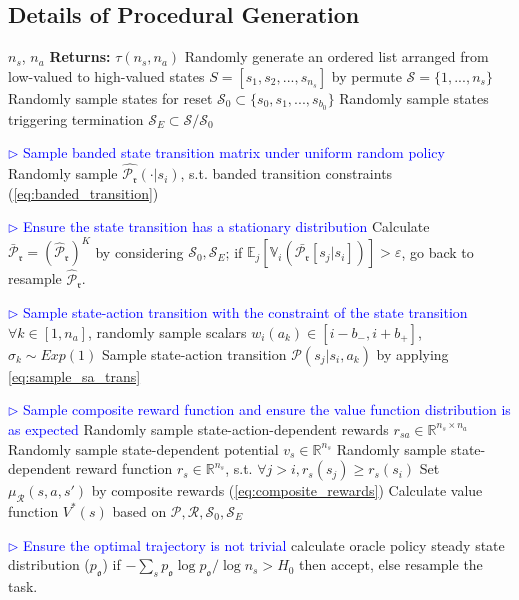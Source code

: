 \documentclass{article}
\newcommand{\TCP}[1]{\textcolor{blue}{$\triangleright$ #1}}
\begin{document}
\subsection{Details of Procedural Generation} \label{sec:anymdp_task_empirical}

\begin{algorithm}[htbp]
   \caption{AnyMDP $TaskSampler$}
   \label{alg:task_sampler}
   \begin{algorithmic}[1]
    $n_s$, $n_a$ {\bfseries Returns:} $\tau(n_s, n_a)$
   \STATE Randomly generate an ordered list arranged from low-valued to high-valued states $S=[s_1,s_2,...,s_{n_s}]$ by permute $\mathcal{S}=\{1,...,n_s\}$
   \STATE Randomly sample states for reset $\mathcal{S}_0 \subset \{s_0, s_1, ...,s_{b_0}\}$
   \STATE Randomly sample states triggering termination $\mathcal{S}_E \subset \mathcal{S} / \mathcal{S}_0$
   
   \TCP{Sample banded state transition matrix under uniform random policy}
       \STATE  Randomly sample $\hat{\mathcal{P}_{\mathfrak{r}}}(\cdot|s_i)$, s.t. banded transition constraints (\cref{eq:banded_transition})
    \ENDFOR

    \TCP{Ensure the state transition has a stationary distribution}
    \STATE Calculate $\bar{\mathcal{P}}_{\mathfrak{r}}=(\hat{\mathcal{P}}_{\mathfrak{r}})^K$ by considering $\mathcal{S}_0, \mathcal{S}_E$; if $\mathbb{E}_j[\mathbb{V}_i(\bar{\mathcal{P}_{\mathfrak{r}}}[s_j|s_i])]>\varepsilon$, go back to resample $\hat{\mathcal{P}}_{\mathfrak{r}}$. \label{alg:line_ergodicity}

   \TCP{Sample state-action transition with the constraint of the state transition}
       \STATE $\forall k\in [1,n_a]$, randomly sample scalars $w_i(a_k) \in [i-b_{-}, i+{b_{+}}]$, $\sigma_k \sim Exp(1)$
       \STATE Sample state-action transition $\mathcal{P}(s_j|s_i, a_k)$ by applying \cref{eq:sample_sa_trans}
    \ENDFOR

    \TCP{Sample composite reward function and ensure the value function distribution is as expected}
    \STATE Randomly sample state-action-dependent rewards $r_{sa} \in \mathbb{R}^{n_s \times n_a}$
    \STATE Randomly sample state-dependent potential $v_s \in \mathbb{R}^{n_s}$
    \REPEAT
       \STATE Randomly sample state-dependent reward function $r_s \in \mathbb{R}^{n_s}$, s.t. $\forall j>i, r_{s}(s_j) \ge r_{s}(s_i)$
       \STATE Set $\mu_\mathcal{R}(s,a,s')$ by composite rewards (\cref{eq:composite_rewards})
       \STATE Calculate value function $V^*(s)$ based on $\mathcal{P}, \mathcal{R}, \mathcal{S}_0, \mathcal{S}_E$

    \TCP{Ensure the optimal trajectory is not trivial}
     calculate oracle policy steady state distribution ($p_{\mathfrak{o}}$)
    \STATE \hspace*{1.5cm} if $-\sum_s p_{\mathfrak{o}} \log{p_{\mathfrak{o}}} / \log{n_s} > H_0$ then accept, else resample the task.
    \end{algorithmic}
\end{algorithm}
\end{document}
